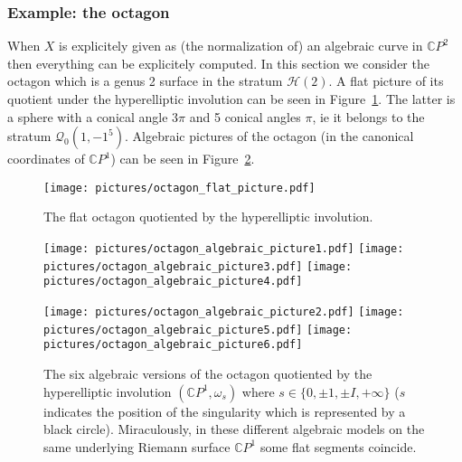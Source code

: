 \documentclass[a4paper,12pt]{article}
\def\bC{\mathbb{C}}
\def\cH{\mathcal{H}}
\def\cQ{\mathcal{Q}}
\begin{document}
\subsubsection{Example: the octagon}
When $X$ is explicitely given as (the normalization of) an algebraic curve in
$\bC P^2$ then everything can be explicitely computed. In this section we
consider the octagon which is a genus 2 surface in the stratum $\cH(2)$. A flat
picture of its quotient under the hyperelliptic involution can be seen in
Figure~\ref{fig:octagonFlat}. The latter is a sphere with a conical angle
$3\pi$ and 5 conical angles $\pi$, ie it belongs to the stratum $\cQ_0(1,-1^5)$.
Algebraic pictures of the octagon (in the canonical coordinates of $\bC P^1$)
can be seen in Figure~\ref{fig:octagonAlgebraic}.

\begin{figure}[!ht]
\begin{center}
\texttt{[image: pictures/octagon\_flat\_picture.pdf]}
\end{center}
\caption{The flat octagon quotiented by the hyperelliptic involution.}
\label{fig:octagonFlat}
\end{figure}

\begin{figure}[!ht]
\begin{center}
\texttt{[image: pictures/octagon\_algebraic\_picture1.pdf]}
\hspace{.8cm}
\texttt{[image: pictures/octagon\_algebraic\_picture3.pdf]}
\hspace{.8cm}
\texttt{[image: pictures/octagon\_algebraic\_picture4.pdf]}

\texttt{[image: pictures/octagon\_algebraic\_picture2.pdf]}
\hspace{.8cm}
\texttt{[image: pictures/octagon\_algebraic\_picture5.pdf]}
\hspace{.8cm}
\texttt{[image: pictures/octagon\_algebraic\_picture6.pdf]}

\end{center}
\caption{The six algebraic versions of the octagon quotiented
by the hyperelliptic involution $(\mathbb{C}P^1, \omega_s)$ where
$s \in \{0, \pm 1, \pm I, +\infty\}$ ($s$ indicates the position
of the singularity which is represented by a black circle).
Miraculously, in these different algebraic models on the same underlying
Riemann surface $\mathbb{C}P^1$ some flat segments coincide.}
\label{fig:octagonAlgebraic}
\end{figure}
\end{document}
